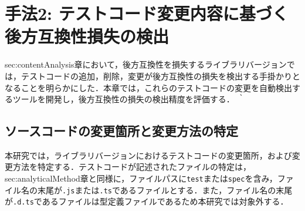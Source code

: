 \documentclass[submit]{ipsj}
\begin{document}
\section{手法2: テストコード変更内容に基づく後方互換性損失の検出}\label{chap:rq2}

{sec:contentAnalysis}章において，後方互換性を損失するライブラリバージョンでは，テストコードの追加，削除，変更が後方互換性の損失を検出する手掛かりとなることを明らかにした．本章では，これらのテストコードの変更を自動検出するツールを開発し，後方互換性の損失の検出精度を評価する．
｀


\subsection{ソースコードの変更箇所と変更方法の特定}\label{subsec:rq2.astseisei}
本研究では，ライブラリバージョンにおけるテストコードの変更箇所，および変更方法を特定する．テストコードが記述されたファイルの特定は，{sec:analyticalMethod}章と同様に，ファイルパスに{\verb|test|}または{\verb|spec|}を含み，ファイル名の末尾が{\verb|.js|}または{\verb|.ts|}であるファイルとする．また，ファイル名の末尾が{\verb|.d.ts|}であるファイルは型定義ファイルであるため本研究では対象外する．
\end{document}

